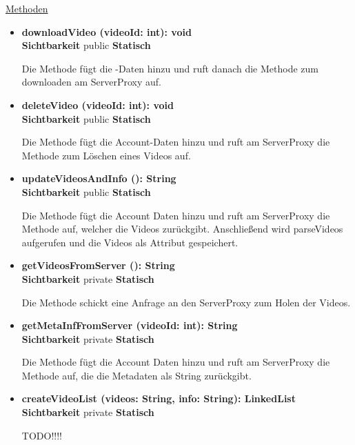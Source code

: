 \underline{Methoden}
\begin{itemize}
\itemsep0pt


\item \textbf{downloadVideo (videoId: int): void}\hfill\\
\textbf{Sichtbarkeit} public \newline
\textbf{Statisch}

Die Methode fügt die -Daten hinzu und ruft danach die Methode zum downloaden am ServerProxy auf.

\item \textbf{deleteVideo (videoId: int): void}\hfill\\
\textbf{Sichtbarkeit} public \newline
\textbf{Statisch}

Die Methode fügt die Account-Daten hinzu und ruft am ServerProxy die Methode zum Löschen eines Videos auf.

\item \textbf{updateVideosAndInfo (): String}\hfill\\
\textbf{Sichtbarkeit} public \newline
\textbf{Statisch}

Die Methode fügt die Account Daten hinzu und ruft am ServerProxy die Methode auf, welcher die Videos zurückgibt. Anschließend wird parseVideos aufgerufen und die Videos als Attribut gespeichert.

\item \textbf{getVideosFromServer (): String}\hfill\\
\textbf{Sichtbarkeit} private \newline
\textbf{Statisch}

Die Methode schickt eine Anfrage an den ServerProxy zum Holen der Videos.

\item \textbf{getMetaInfFromServer (videoId: int): String}\hfill\\
\textbf{Sichtbarkeit} private \newline
\textbf{Statisch}

Die Methode fügt die Account Daten hinzu und ruft am ServerProxy die Methode auf, die die Metadaten als String zurückgibt.

\item \textbf{createVideoList (videos: String, info: String): LinkedList}\hfill\\
\textbf{Sichtbarkeit} private \newline
\textbf{Statisch}

TODO!!!!

\end{itemize}